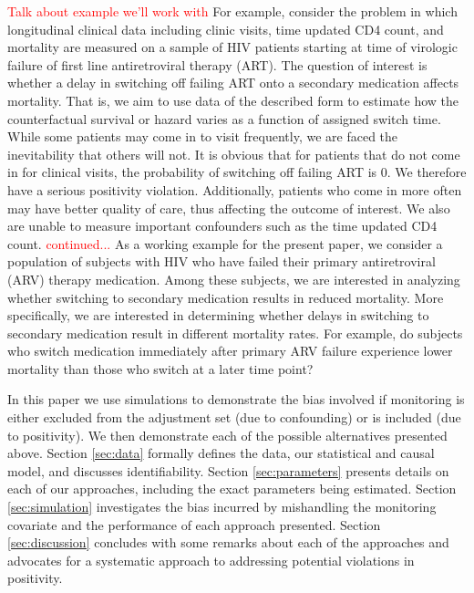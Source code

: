 \documentclass{article}\usepackage[]{graphicx}\usepackage[]{color}
\begin{document}
\textcolor{red}{Talk about example we'll work with} For example, consider the
problem in which longitudinal clinical data including clinic visits, time
updated CD4 count, and mortality are measured on a sample of HIV patients
starting at time of virologic failure of first line antiretroviral therapy
(ART). The question of interest is whether a delay in switching off failing ART
onto a secondary medication affects mortality.
That is, we aim to use data of the described form to estimate how the
counterfactual survival or hazard varies as a function of assigned
switch time. While some patients may come in to visit frequently, we are faced
the inevitability that others will not. It is obvious that for patients that do
not come in for clinical visits, the probability of switching off failing ART is
0. We therefore have a serious positivity violation. Additionally, patients who
come in more often may have better quality of care, thus affecting the outcome
of interest. We also are unable to measure important confounders such as the
time updated CD4 count. \textcolor {red} {continued...} As a working example for
the present paper, we consider a population of subjects with HIV who have failed their primary antiretroviral (ARV) therapy
medication. Among these subjects, we are interested in analyzing whether
switching to secondary medication results in reduced mortality. More
specifically, we are interested in determining whether delays in switching to
secondary medication result in different mortality rates. For example,
do subjects who switch medication immediately after primary ARV failure
experience lower mortality than those who switch at a later time point?
\newline

In this paper we use simulations to demonstrate the bias involved if
monitoring is either excluded from the adjustment set (due to confounding) or
is included (due to positivity). We then demonstrate each of the possible
alternatives presented above. Section \ref{sec:data} formally defines the data,
our statistical and causal model, and discusses identifiability.
Section \ref{sec:parameters} presents details on each of our approaches,
including the exact parameters being estimated. Section \ref{sec:simulation}
investigates the bias incurred by mishandling the monitoring covariate and the
performance of each approach presented. Section \ref{sec:discussion} concludes
with some remarks about each of the approaches and advocates for a systematic
approach to addressing potential violations in positivity.
\end{document}

